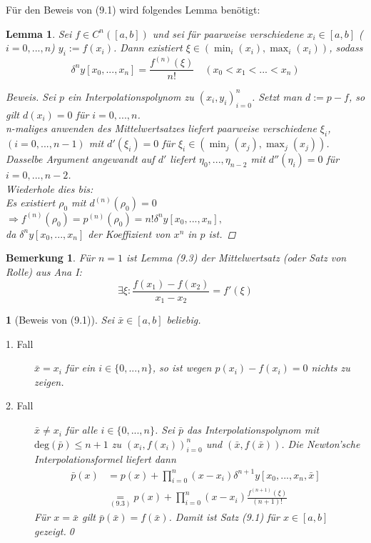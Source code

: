 \documentclass[12pt]{article}
\theoremstyle{break}
\newtheorem{lemma}[theorem]{Lemma}
\newtheorem*{comment*}{Bemerkung}
\newtheorem{nothing}[theorem]{}
\begin{document}
Für den Beweis von (9.1) wird folgendes Lemma benötigt:

\begin{lemma}
Sei $f \in C^n([a,b])$ und sei für paarweise verschiedene $x_i \in [a,b]$ ($i=0,...,n$) $y_i := f(x_i)$. Dann existiert $\xi \in (\min_i(x_i), \max_i(x_i))$, sodass 
$$\delta^ny[x_0,..., x_n] = \frac{f^{(n)}(\xi)}{n!}\quad (x_0 < x_1 < ... < x_n)$$
\begin{proof}[Beweis]
Sei $p$ ein Interpolationspolynom zu $(x_i, y_i)_{i=0}^n$. Setzt man $d:= p-f$, so gilt $d(x_i) = 0$ für $i=0,...,n$.\\
n-maliges anwenden des Mittelwertsatzes liefert paarweise verschiedene $\xi_i$, $(i=0, ...,n-1)$ mit $d'(\xi_i) = 0$ für $\xi_i \in (\min_j(x_j), \max_j(x_j))$. \\
Dasselbe Argument angewandt auf $d'$ liefert $\eta_0,..., \eta_{n-2}$ mit $d''(\eta_i) = 0$ für $i=0,..., n-2$.\\
Wiederhole dies bis:\\
Es existiert $\rho_0$ mit $d^{(n)}(\rho_0) = 0$\\
$\Rightarrow f^{(n)}(\rho_0) = p^{(n)}(\rho_0) = n! \delta^ny[x_0,..., x_n],$\\
da $\delta^ny[x_0, ..., x_n]$ der Koeffizient von $x^n$ in $p$ ist.
\end{proof}
\end{lemma}

\begin{comment*}
Für $n=1$ ist Lemma (9.3) der Mittelwertsatz (oder Satz von Rolle) aus Ana I:
$$ \exists \xi: \frac{f(x_1)-f(x_2)}{x_1-x_2} = f'(\xi)$$
\end{comment*}

\begin{nothing}[Beweis von (9.1)]
Sei $\bar{x} \in [a,b]$ beliebig.
\begin{description}
  \item[1. Fall] $\bar{x} = x_i$ für ein $i \in \{0,...,n\}$, so ist wegen $p(x_i) - f(x_i) = 0$ nichts zu zeigen.
  
  \item[2. Fall] $\bar{x} \neq x_i$ für alle $i \in \{0,...,n\}$. Sei $\bar{p}$ das Interpolationspolynom mit $\text{deg}(\bar{p}) \leq n+1$ zu $(x_i, f(x_i))_{i=0}^n$ und $(\bar{x}, f(\bar{x}))$. Die Newton'sche Interpolationsformel liefert dann
  \begin{align*}
  \bar{p}(x) &= p(x) + \prod_{i=0}^n(x-x_i)\delta^{n+1}y[x_0,...,x_n, \bar{x}] &\\
  &\underset{(9.3)}{=} p(x) + \prod_{i=0}^n(x-x_i) \frac{f^{(n+1)}(\xi)}{(n+1)!}
  \end{align*}
  Für $x = \bar{x}$ gilt $\bar{p}(\bar{x}) = f(\bar{x})$. Damit ist Satz (9.1) für $x\in[a,b]$ gezeigt.\qed
\end{description}
\end{nothing}
\end{document}
